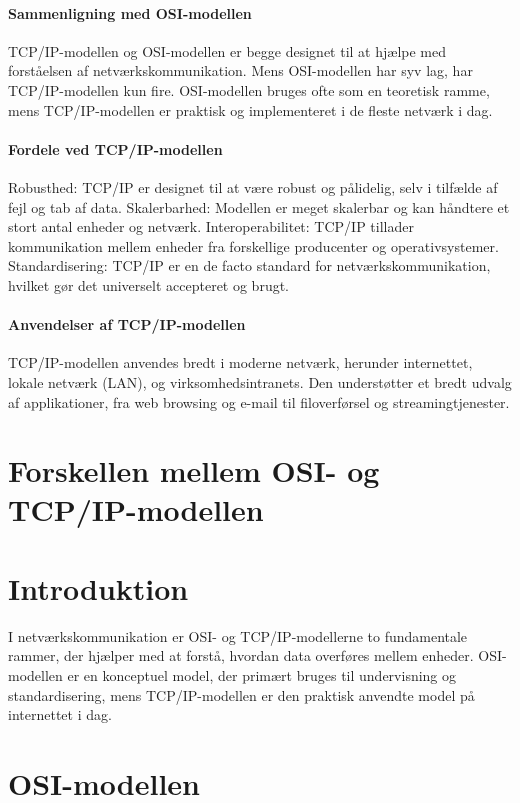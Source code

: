 \paragraph{Sammenligning med OSI-modellen}
TCP/IP-modellen og OSI-modellen er begge designet til at hjælpe med forståelsen af netværkskommunikation. Mens OSI-modellen har syv lag, har TCP/IP-modellen kun fire. OSI-modellen bruges ofte som en teoretisk ramme, mens TCP/IP-modellen er praktisk og implementeret i de fleste netværk i dag.

\paragraph{Fordele ved TCP/IP-modellen}
Robusthed: TCP/IP er designet til at være robust og pålidelig, selv i tilfælde af fejl og tab af data.
Skalerbarhed: Modellen er meget skalerbar og kan håndtere et stort antal enheder og netværk.
Interoperabilitet: TCP/IP tillader kommunikation mellem enheder fra forskellige producenter og operativsystemer.
Standardisering: TCP/IP er en de facto standard for netværkskommunikation, hvilket gør det universelt accepteret og brugt.

\paragraph{Anvendelser af TCP/IP-modellen}
TCP/IP-modellen anvendes bredt i moderne netværk, herunder internettet, lokale netværk (LAN), og virksomhedsintranets. Den understøtter et bredt udvalg af applikationer, fra web browsing og e-mail til filoverførsel og streamingtjenester.

\section{Forskellen mellem OSI- og TCP/IP-modellen}
\section*{Introduktion}
I netværkskommunikation er OSI- og TCP/IP-modellerne to fundamentale rammer, der hjælper med at forstå, hvordan data overføres mellem enheder. OSI-modellen er en konceptuel model, der primært bruges til undervisning og standardisering, mens TCP/IP-modellen er den praktisk anvendte model på internettet i dag.

\section{OSI-modellen}
